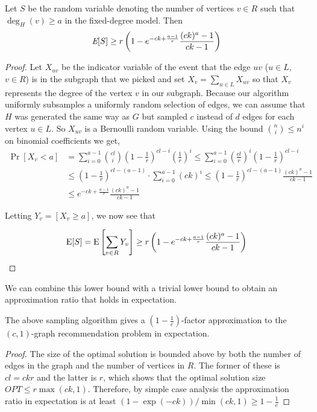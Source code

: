 \begin{thm}\label{original_result}
Let $S$ be the
random variable denoting the number of vertices $v \in R$ such that
$\deg_{H}(v)\geq a$ in the fixed-degree model. Then
\[ \emph{\text{E}}[S] \geq r\left(1-e^{-ck+\frac{a-1}{r}}\frac{(ck)^a-1}{ck-1}\right)  \]
\end{thm}

\begin{proof}
Let $X_{uv}$ be the indicator variable of the event that the edge $uv$
($u\in L$, $v\in R$) is in the subgraph that we picked
and set $X_{v} = \sum_{u\in L} X_{uv}$ so that $X_{v}$ represents the
degree of the vertex $v$ in our subgraph. Because our algorithm
uniformly subsamples a uniformly random selection of edges, we can
assume that $H$ was generated the same way as $G$ but sampled $c$
instead of $d$ edges for each vertex $u\in L$. So $X_{uv}$ is a
Bernoulli random variable. Using the bound $\binom{n}{i}
\leq n^i$ on binomial coefficients we get,
\begin{align*}
      \Pr[X_v < a]
&=    \sum_{i=0}^{a-1} \binom{cl}{i} \left(1-\frac{1}{r}\right)^{cl-i}\left(\frac{1}{r}\right)^i
 \leq \sum_{i=0}^{a-1} \left(\frac{cl}{r}\right)^i\left(1-\frac{1}{r}\right)^{cl-i} \\
&\leq    \left(1-\frac{1}{r}\right)^{cl-(a-1)} \cdot \sum_{i=0}^{a-1} (ck)^i
 \leq \left(1-\frac{1}{r}\right)^{cl-(a-1)}\frac{(ck)^a-1}{ck-1} \\
&\leq e^{-ck+\frac{a-1}{r}} \frac{(ck)^a-1}{ck-1}
\end{align*}


Letting $Y_v = \left[X_v \geq a\right]$, we now see that

\[ \text{E}[S] = \text{E}\left[\sum_{v\in R} Y_v\right] \geq r\left(1-e^{-ck+\frac{a-1}{r}} \frac{(ck)^a-1}{ck-1}\right) \]
\end{proof}

We can combine this lower bound with a trivial lower bound to obtain an
approximation ratio that holds in expectation.

\begin{thm}
The above sampling algorithm gives a $\left(1-\frac1e\right)$-factor approximation to the $(c,1)$-graph recommendation problem in expectation.
\end{thm}
\begin{proof}
The size of the optimal solution is bounded above by both the number
of edges in the graph and the number of vertices in $R$. The former of
these is $cl=ckr$ and the latter is $r$, which shows that the optimal solution size
$OPT \leq
r\max(ck,1)$. Therefore, by simple case analysis the approximation ratio
in expectation is at least
$ ({1-\exp(-ck)})/\min(ck,1) \geq 1-\frac{1}{e} $
\end{proof}


